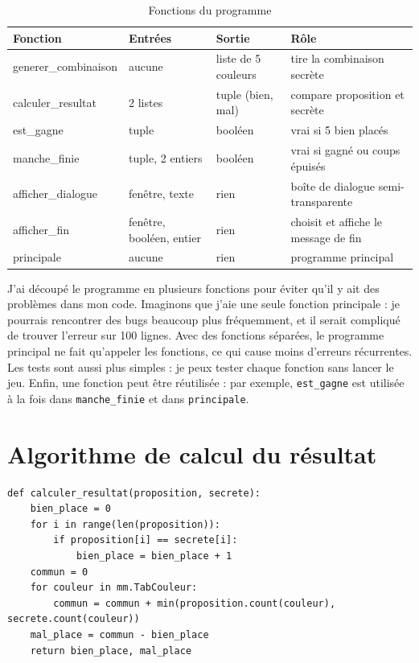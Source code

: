 \documentclass[11pt,a4paper]{article}
\begin{document}
\begin{table}[h]
\centering
\begin{tabular}{>{\ttfamily}l l l p{5cm}}
\toprule
\textrm{\textbf{Fonction}} & \textbf{Entrées} & \textbf{Sortie} & \textbf{Rôle} \\
\midrule
generer\_combinaison & aucune & liste de 5 couleurs & tire la combinaison secrète \\
calculer\_resultat & 2 listes & tuple (bien, mal) & compare proposition et secrète \\
est\_gagne & tuple & booléen & vrai si 5 bien placés \\
manche\_finie & tuple, 2 entiers & booléen & vrai si gagné ou coups épuisés \\
afficher\_dialogue & fenêtre, texte & rien & boîte de dialogue semi-transparente \\
afficher\_fin & fenêtre, booléen, entier & rien & choisit et affiche le message de fin \\
principale & aucune & rien & programme principal \\
\bottomrule
\end{tabular}
\caption{Fonctions du programme}
\end{table}

J'ai découpé le programme en plusieurs fonctions pour éviter qu'il y ait des problèmes dans mon code. Imaginons que j'aie une seule fonction principale : je pourrais rencontrer des bugs beaucoup plus fréquemment, et il serait compliqué de trouver l'erreur sur 100 lignes. Avec des fonctions séparées, le programme principal ne fait qu'appeler les fonctions, ce qui cause moins d'erreurs récurrentes. Les tests sont aussi plus simples : je peux tester chaque fonction sans lancer le jeu. Enfin, une fonction peut être réutilisée : par exemple, \texttt{est\_gagne} est utilisée à la fois dans \texttt{manche\_finie} et dans \texttt{principale}.

\section{Algorithme de calcul du résultat}

\begin{lstlisting}
def calculer_resultat(proposition, secrete):
    bien_place = 0
    for i in range(len(proposition)):
        if proposition[i] == secrete[i]:
            bien_place = bien_place + 1
    commun = 0
    for couleur in mm.TabCouleur:
        commun = commun + min(proposition.count(couleur), secrete.count(couleur))
    mal_place = commun - bien_place
    return bien_place, mal_place
\end{lstlisting}
\end{document}
